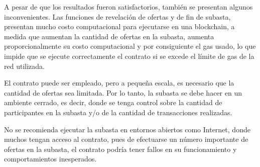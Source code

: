     A pesar de que los resultados fueron satisfactorios, también se presentan algunos inconvenientes.
    Las funciones de revelación de ofertas y de fin de subasta, presentan mucho costo computacional para 
    ejecutarse en una blockchain, a medida que aumentan la cantidad de ofertas en la subasta, aumenta 
    proporcionalmente 
    su costo computacional y por consiguiente el gas usado, lo que impide que se ejecute correctamente el contrato
    si se excede el límite de gas de la red utilizada.


    El contrato puede ser empleado, pero a pequeña escala, es necesario que la cantidad de ofertas sea 
    limitada. Por lo tanto, la subasta se debe hacer en un ambiente cerrado, es decir, donde se tenga
    control sobre la cantidad de participantes en la subasta y/o de la cantidad de transacciones realizadas.
    
    No se recomienda ejecutar la subasta en entornos abiertos como Internet, donde muchos tengan acceso al
    contrato, pues de efectuarse un número importante de ofertas en la subasta, el contrato podría tener
    fallos en su funcionamiento y comportamientos inesperados.